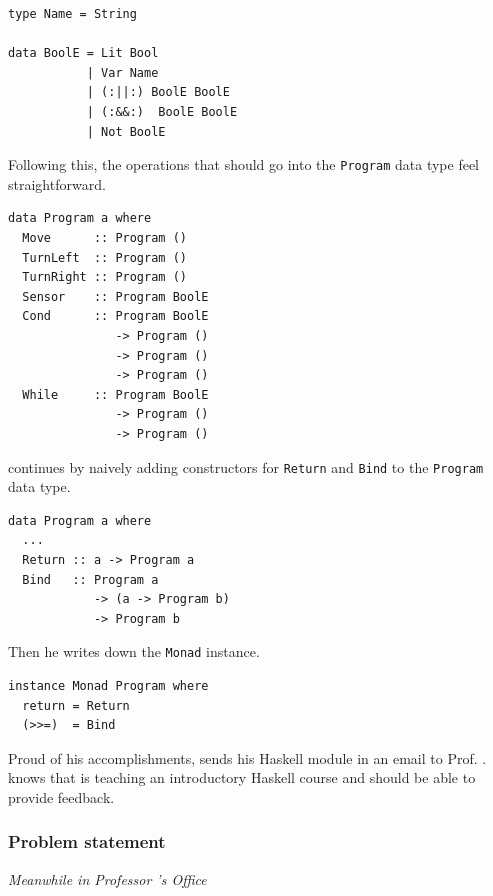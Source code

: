 \begin{small} 
\begin{verbatim}
type Name = String

data BoolE = Lit Bool
           | Var Name
           | (:||:) BoolE BoolE
           | (:&&:)  BoolE BoolE
           | Not BoolE  
\end{verbatim} 
\end{small}  

Following this, the  operations that should go into the {\tt Program} data type 
feel straightforward.

\begin{small} 
\begin{verbatim}
data Program a where 
  Move      :: Program () 
  TurnLeft  :: Program () 
  TurnRight :: Program () 
  Sensor    :: Program BoolE
  Cond      :: Program BoolE 
               -> Program () 
               -> Program ()
               -> Program ()  
  While     :: Program BoolE 
               -> Program () 
               -> Program () 
\end{verbatim} 
\end{small} 

\studname{} continues by naively adding constructors for {\tt Return} and 
{\tt Bind} to the {\tt Program} data type.   

\begin{small} 
\begin{verbatim}
data Program a where 
  ...
  Return :: a -> Program a 
  Bind   :: Program a 
            -> (a -> Program b)
            -> Program b 
\end{verbatim} 
\end{small}
 
\pagebreak 

Then he writes down the {\tt Monad} instance.
 
\begin{small} 
\begin{verbatim}
instance Monad Program where 
  return = Return 
  (>>=)  = Bind 
\end{verbatim} 
\end{small} 

Proud of his accomplishments, \studname{} sends his Haskell module in an 
email to Prof. \docname{}. \studname{} knows that \docname{} is teaching an 
introductory Haskell course and should be able to provide feedback.



\subsubsection{Problem statement} 
\emph{Meanwhile in Professor \docname{}'s Office}\newline %

